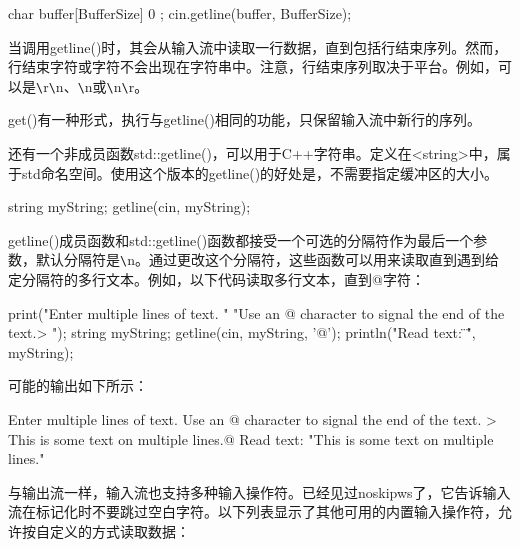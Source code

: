 \begin{cpp}
char buffer[BufferSize] { 0 };
cin.getline(buffer, BufferSize);
\end{cpp}

当调用getline()时，其会从输入流中读取一行数据，直到包括行结束序列。然而，行结束字符或字符不会出现在字符串中。注意，行结束序列取决于平台。例如，可以是\verb|\|r\verb|\|n、\verb|\|n或\verb|\|n\verb|\|r。

get()有一种形式，执行与getline()相同的功能，只保留输入流中新行的序列。

还有一个非成员函数std::getline()，可以用于C++字符串。定义在<string>中，属于std命名空间。使用这个版本的getline()的好处是，不需要指定缓冲区的大小。

\begin{cpp}
string myString;
getline(cin, myString);
\end{cpp}

getline()成员函数和std::getline()函数都接受一个可选的分隔符作为最后一个参数，默认分隔符是\verb|\|n。通过更改这个分隔符，这些函数可以用来读取直到遇到给定分隔符的多行文本。例如，以下代码读取多行文本，直到@字符：

\begin{cpp}
print("Enter multiple lines of text. "
      "Use an @ character to signal the end of the text.\n> ");
string myString;
getline(cin, myString, '@');
println("Read text: \"{}\"", myString);
\end{cpp}

可能的输出如下所示：

\begin{shell}
Enter multiple lines of text. Use an @ character to signal the end of the text.
> This is some
text on multiple
lines.@
Read text: "This is some
text on multiple
lines."
\end{shell}



与输出流一样，输入流也支持多种输入操作符。已经见过noskipws了，它告诉输入流在标记化时不要跳过空白字符。以下列表显示了其他可用的内置输入操作符，允许按自定义的方式读取数据：

